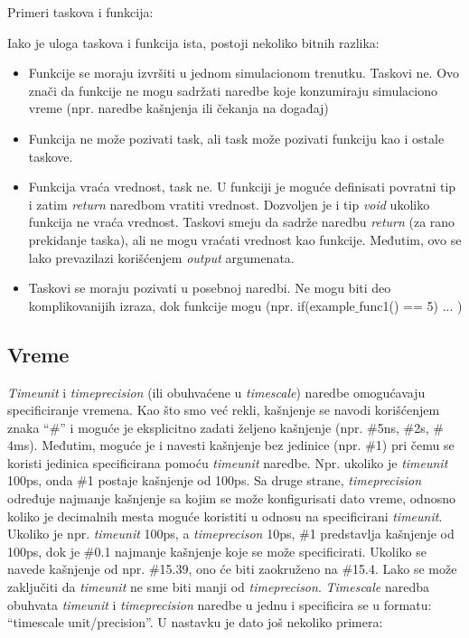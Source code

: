 Primeri taskova i funkcija:


Iako je uloga taskova i funkcija ista, postoji nekoliko bitnih razlika:
\begin{itemize}
\item Funkcije se moraju izvršiti u jednom simulacionom trenutku. Taskovi ne.
  Ovo znači da funkcije ne mogu sadržati naredbe koje konzumiraju simulaciono
  vreme (npr. naredbe kašnjenja ili čekanja na događaj)
\item Funkcija ne može pozivati task, ali task može pozivati funkciju kao i
  ostale taskove.
\item Funkcija vraća vrednost, task ne. U funkciji je moguće definisati povratni
  tip i zatim \emph{return} naredbom vratiti vrednost. Dozvoljen je i tip
  \emph{void} ukoliko funkcija ne vraća vrednost. Taskovi smeju da sadrže
  naredbu \emph{return} (za rano prekidanje taska), ali ne mogu vraćati vrednost
  kao funkcije. Međutim, ovo se lako prevazilazi korišćenjem \emph{output}
  argumenata.
\item Taskovi se moraju pozivati u posebnoj naredbi. Ne mogu biti deo
  komplikovanijih izraza, dok funkcije mogu (npr. if(example\(\_\)func1() == 5) ... )
\end{itemize}


\subsection{Vreme}

\emph{Timeunit} i \emph{timeprecision} (ili obuhvaćene u \emph{timescale})
naredbe omogućavaju specificiranje vremena.
Kao što smo već rekli, kašnjenje se navodi korišćenjem znaka ``\(\#\)'' i moguće
je eksplicitno zadati željeno kašnjenje (npr. \(\#\)5ns, \(\#\)2s, \(\#\)4ms).
Međutim, moguće je i navesti kašnjenje bez jedinice (npr. \(\#\)1) pri čemu se
koristi jedinica specificirana pomoću \emph{timeunit} naredbe.
Npr. ukoliko je \emph{timeunit} 100ps, onda \(\#\)1 postaje kašnjenje od 100ps.
Sa druge strane, \emph{timeprecision} određuje najmanje kašnjenje sa kojim se
može konfigurisati dato vreme, odnosno koliko je decimalnih mesta moguće
koristiti u odnosu na specificirani \emph{timeunit}.
Ukoliko je npr. \emph{timeunit} 100ps, a \emph{timeprecison} 10ps, \(\#\)1
predstavlja kašnjenje od 100ps, dok je \(\#\)0.1 najmanje kašnjenje koje se može
specificirati.
Ukoliko se navede kašnjenje od npr. \(\#\)15.39, ono će biti zaokruženo na
\(\#\)15.4.
Lako se može zaključiti da \emph{timeunit} ne sme biti manji od
\emph{timeprecison}.
\emph{Timescale} naredba obuhvata \emph{timeunit} i \emph{timeprecision} naredbe
u jednu i specificira se u formatu: ``timescale unit/precision''.
U nastavku je dato još nekoliko primera:

